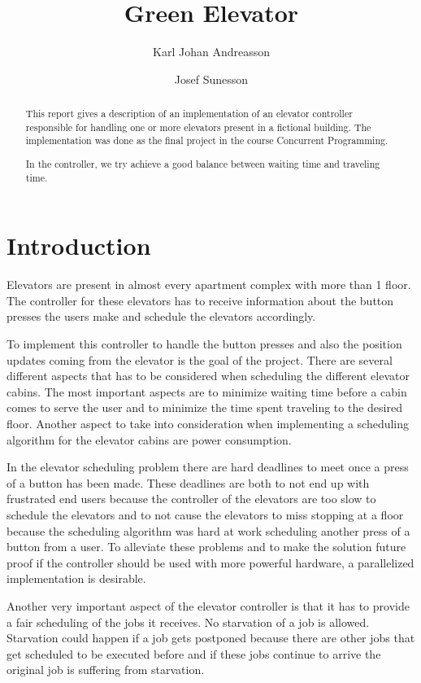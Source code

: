 \documentclass[10pt,a4paper]{article}
\author{Karl Johan Andreasson \and Josef Sunesson}
\title{Green Elevator}
\begin{document}
\maketitle

\begin{abstract}
This report gives a description of an implementation of an elevator controller responsible for handling one or more elevators present in a fictional building. The implementation was done as the final project in the course Concurrent Programming.

In the controller, we try achieve a good balance between waiting time and traveling time.
\end{abstract}

\section{Introduction}
\label{sec:intro}
Elevators are present in almost every apartment complex with more than 1 floor. The controller for these elevators has to receive information about the button presses the users make and schedule the elevators accordingly.

To implement this controller to handle the button presses and also the position updates coming from the elevator is the goal of the project. There are several different aspects that has to be considered when scheduling the different elevator cabins. The most important aspects are to minimize waiting time before a cabin comes to serve the user and to minimize the time spent traveling to the desired floor. Another aspect to take into consideration when implementing a scheduling algorithm for the elevator cabins are power consumption.

In the elevator scheduling problem there are hard deadlines to meet once a press of a button has been made. These deadlines are both to not end up with frustrated end users because the controller of the elevators are too slow to schedule the elevators and to not cause the elevators to miss stopping at a floor because the scheduling algorithm was hard at work scheduling another press of a button from a user. To alleviate these problems and to make the solution future proof if the controller should be used with more powerful hardware, a parallelized implementation is desirable.

Another very important aspect of the elevator controller is that it has to provide a fair scheduling of the jobs it receives. No starvation of a job is allowed. Starvation could happen if a job gets postponed because there are other jobs that get scheduled to be executed before and if these jobs continue to arrive the original job is suffering from starvation.
\end{document}
